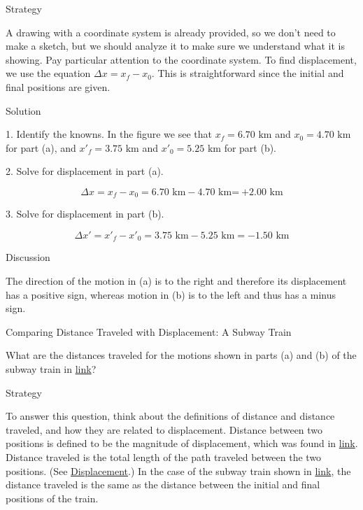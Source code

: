 \documentclass[
]{book}
\begin{document}
{Strategy}

A drawing with a coordinate system is already provided, so we don't
need to make a sketch, but we should analyze it to make sure we
understand what it is showing. Pay particular attention to the
coordinate system. To find displacement, we use the equation
\({\Delta x = {x_{f} - x_{0}}}{}\). This is straightforward since the
initial and final positions are given.

{Solution}

1. Identify the knowns. In the figure we see that
\({x_{f} =}\text{6.70\ km}\) and \({x_{0} =}\text{4.70\ km}\) for part (a),
and \({{x\prime}_{f} = 3}\text{.75\ km}\) and
\({{x\prime}_{0} = 5}\text{.25\ km}\) for part (b).

2. Solve for displacement in part (a).

\leavevmode{}%
\[{{{\Delta x = {x_{f} - x_{0}}} = 6}\text{.}{\text{70\ km} - 4}\text{.}\text{70\ km}\text{=}\ \text{+}2\text{.}\text{00\ km}}{}\]

3. Solve for displacement in part (b).

\leavevmode{}%
\[\Delta x\prime{{= {{x\prime}_{f} - {x\prime}_{0}}} = \text{3.75\ km} - \text{5.25\ km} = - \text{1.50\ km}}\]

{Discussion}

The direction of the motion in (a) is to the right and therefore its
displacement has a positive sign, whereas motion in (b) is to the left
and thus has a minus sign.

\hypertarget{fs-id4082275}{}
Comparing Distance Traveled with Displacement: A Subway Train

What are the distances traveled for the motions shown in parts (a) and
(b) of the subway train in
\protect\hyperlink{import-auto-id2590556}{link}?

{Strategy}

To answer this question, think about the definitions of distance and
distance traveled, and how they are related to displacement. Distance
between two positions is defined to be the magnitude of displacement,
which was found in \protect\hyperlink{fs-id1744930}{link}.
Distance traveled is the total length of the path traveled between the
two positions. (See \href{/m54769}{Displacement}.) In the case of the subway
train shown in \protect\hyperlink{import-auto-id2590556}{link},
the distance traveled is the same as the distance between the initial
and final positions of the train.
\end{document}
